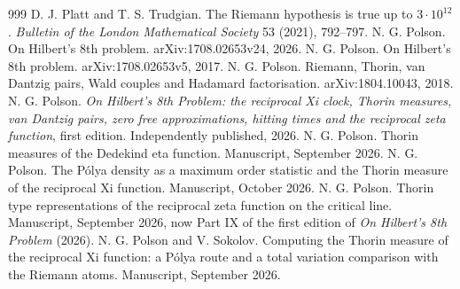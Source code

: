\begin{thebibliography}{999}
 D. J. Platt and T. S. Trudgian. The Riemann hypothesis is true up to $3\cdot10^{12}$. \emph{Bulletin of the London Mathematical Society} 53 (2021), 792--797.
 N. G. Polson. On Hilbert's 8th problem. arXiv:1708.02653v24, 2026.
 N. G. Polson. On Hilbert's 8th problem. arXiv:1708.02653v5, 2017.
 N. G. Polson. Riemann, Thorin, van Dantzig pairs, Wald couples and Hadamard factorisation. arXiv:1804.10043, 2018.
 N. G. Polson. \emph{On Hilbert's 8th Problem: the reciprocal Xi clock, Thorin measures, van Dantzig pairs, zero free approximations, hitting times and the reciprocal zeta function}, first edition. Independently published, 2026.
 N. G. Polson. Thorin measures of the Dedekind eta function. Manuscript, September 2026.
 N. G. Polson. The P\'olya density as a maximum order statistic and the Thorin measure of the reciprocal Xi function. Manuscript, October 2026.
 N. G. Polson. Thorin type representations of the reciprocal zeta function on the critical line. Manuscript, September 2026, now Part IX of the first edition of \emph{On Hilbert's 8th Problem} (2026).
 N. G. Polson and V. Sokolov. Computing the Thorin measure of the reciprocal Xi function: a P\'olya route and a total variation comparison with the Riemann atoms. Manuscript, September 2026.

\end{thebibliography}
